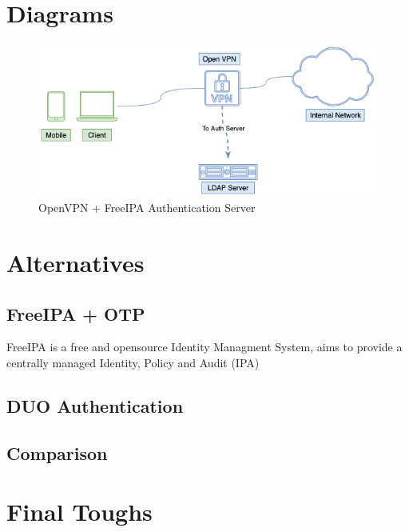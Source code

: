   \newpage
  
  \section{Diagrams}
  
  \begin{figure}[!h]
      \centering
      \includegraphics[width=160mm]{images/Pfsense - FreeIPA.drawio.png}
      \caption{OpenVPN + FreeIPA Authentication Server}
      \label{fig:label}
  \end{figure}
  
  
  
  \newpage
  \section{Alternatives}
  
  \subsection{FreeIPA + OTP}
  FreeIPA is a free and opensource Identity Managment System, aims to provide a centrally managed Identity, Policy and Audit (IPA)
  \subsection{DUO Authentication}
  \subsection{Comparison}
  
  \newpage
  \section{Final Toughs}



